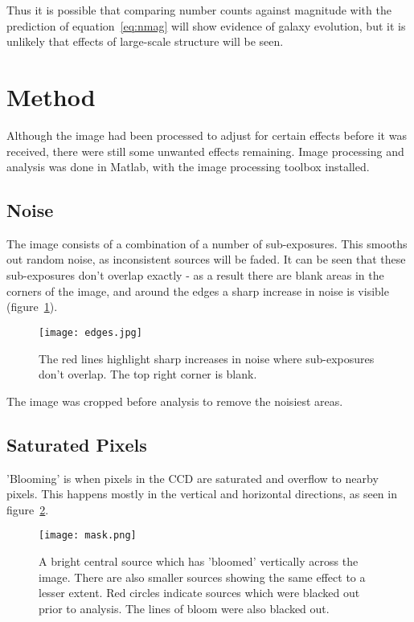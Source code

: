 \documentclass[a4paper,11pt,twoside]{article}
\begin{document}
Thus it is  possible that comparing number counts against magnitude 
with the prediction of equation~\ref{eq:nmag} will show evidence of 
galaxy evolution, but it is unlikely that effects of large-scale
structure will be seen.

\section{Method}

Although the image had been processed to adjust for certain effects 
before it was received, there were still some unwanted effects 
remaining. Image processing and analysis was done in Matlab, with 
the image processing toolbox installed.

\subsection{Noise}

The image consists of a combination of a number of sub-exposures. 
This smooths out random noise, as inconsistent 
sources will be faded. It can be seen that these sub-exposures 
don't overlap exactly - as a result there 
are blank areas in the corners of the image, and around the edges a 
sharp increase in noise is visible (figure~\ref{fig:edges}). 

\begin{figure}[htb]
  \centering
  \texttt{[image: edges.jpg]}
  \caption{The red lines highlight sharp increases in noise where 
sub-exposures don't overlap. The top right corner is blank.}
  \label{fig:edges}
\end{figure}

The image was cropped before analysis to remove the noisiest areas.

\subsection{Saturated Pixels}
'Blooming' is when pixels in the CCD are saturated and overflow 
to nearby pixels. This  happens mostly in the vertical
 and horizontal directions, as seen in figure~\ref{fig:mask}.

\begin{figure}[htb]
  \centering
  \texttt{[image: mask.png]}
  \caption{A bright central source which has 'bloomed' vertically across
 the image. There are also smaller sources showing the same effect to 
a lesser extent. Red circles indicate sources which were blacked out 
prior to analysis. The lines of bloom were also blacked out.}
  \label{fig:mask}
\end{figure}
\end{document}
